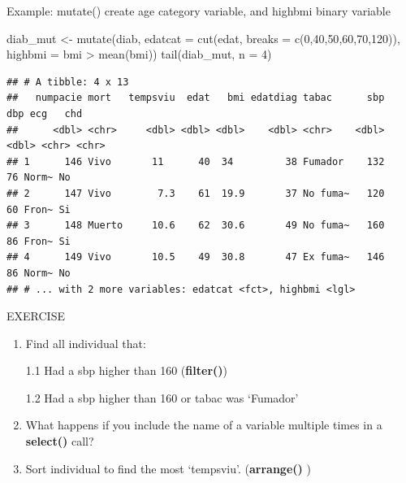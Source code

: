 \documentclass[
  ignorenonframetext,
]{beamer}
\newenvironment{Shaded}{\begin{snugshade}}{\end{snugshade}}
\newcommand{\AttributeTok}[1]{\textcolor[rgb]{0.77,0.63,0.00}{#1}}
\newcommand{\DecValTok}[1]{\textcolor[rgb]{0.00,0.00,0.81}{#1}}
\newcommand{\FunctionTok}[1]{\textcolor[rgb]{0.00,0.00,0.00}{#1}}
\newcommand{\NormalTok}[1]{#1}
\newcommand{\OtherTok}[1]{\textcolor[rgb]{0.56,0.35,0.01}{#1}}
\newcommand{\SpecialCharTok}[1]{\textcolor[rgb]{0.00,0.00,0.00}{#1}}
\begin{document}
\begin{frame}[fragile]{Example: mutate()}
\protect\hypertarget{example-mutate}{}
create age category variable, and highbmi binary variable \tiny

\begin{Shaded}
\begin{Highlighting}[]
\NormalTok{diab\_mut }\OtherTok{\textless{}{-}} \FunctionTok{mutate}\NormalTok{(diab,}
            \AttributeTok{edatcat =} \FunctionTok{cut}\NormalTok{(edat, }\AttributeTok{breaks =} \FunctionTok{c}\NormalTok{(}\DecValTok{0}\NormalTok{,}\DecValTok{40}\NormalTok{,}\DecValTok{50}\NormalTok{,}\DecValTok{60}\NormalTok{,}\DecValTok{70}\NormalTok{,}\DecValTok{120}\NormalTok{)),}
            \AttributeTok{highbmi =}\NormalTok{ bmi }\SpecialCharTok{\textgreater{}} \FunctionTok{mean}\NormalTok{(bmi))}
\FunctionTok{tail}\NormalTok{(diab\_mut, }\AttributeTok{n =} \DecValTok{4}\NormalTok{)}
\end{Highlighting}
\end{Shaded}

\begin{verbatim}
## # A tibble: 4 x 13
##   numpacie mort   tempsviu  edat   bmi edatdiag tabac      sbp   dbp ecg   chd  
##      <dbl> <chr>     <dbl> <dbl> <dbl>    <dbl> <chr>    <dbl> <dbl> <chr> <chr>
## 1      146 Vivo       11      40  34         38 Fumador    132    76 Norm~ No   
## 2      147 Vivo        7.3    61  19.9       37 No fuma~   120    60 Fron~ Si   
## 3      148 Muerto     10.6    62  30.6       49 No fuma~   160    86 Fron~ Si   
## 4      149 Vivo       10.5    49  30.8       47 Ex fuma~   146    86 Norm~ No   
## # ... with 2 more variables: edatcat <fct>, highbmi <lgl>
\end{verbatim}

\normalsize

\footnotesize

\begin{Shaded}
\end{Shaded}

\normalsize
\end{frame}

\begin{frame}{EXERCISE}
\protect\hypertarget{exercise}{}
\begin{enumerate}
\item
  Find all individual that:

  1.1 Had a sbp higher than 160 (\textbf{filter()})

  1.2 Had a sbp higher than 160 or tabac was `Fumador'
\item
  What happens if you include the name of a variable multiple times in a
  \textbf{select()} call?
\item
  Sort individual to find the most `tempsviu'. (\textbf{arrange() })
\end{enumerate}

\footnotesize

\normalsize
\end{frame}
\end{document}
